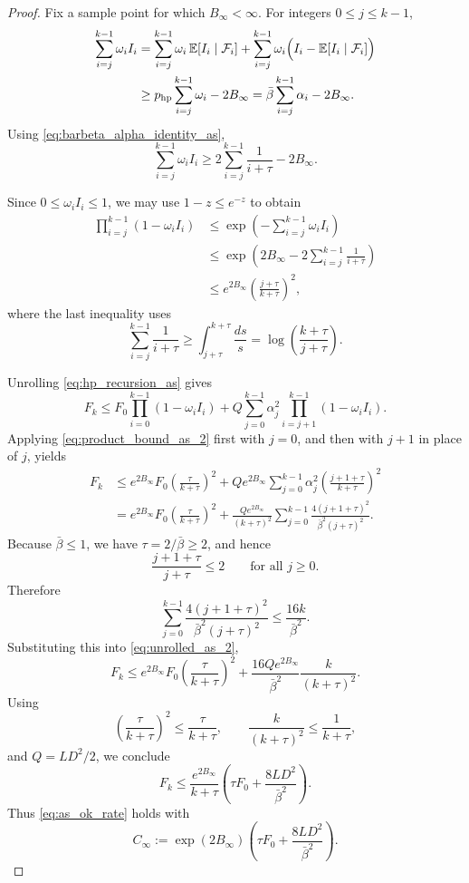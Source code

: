 \documentclass{article}
\begin{document}
\begin{proof}
Fix a sample point for which \(B_\infty<\infty\). For integers
\(0\le j\le k-1\),
\begin{align}
\sum_{i=j}^{k-1}\omega_i I_i
&=
\sum_{i=j}^{k-1}\omega_i\,\mathbb E[I_i\mid\mathcal F_i]
+
\sum_{i=j}^{k-1}
\omega_i\Bigl(I_i-\mathbb E[I_i\mid\mathcal F_i]\Bigr)
\nonumber\\
&\ge
p_{\mathrm{hp}}\sum_{i=j}^{k-1}\omega_i
-
2B_\infty
=
\bar\beta\sum_{i=j}^{k-1}\alpha_i
-
2B_\infty.
\label{eq:weighted_sum_lower_as_1}
\end{align}
Using \eqref{eq:barbeta_alpha_identity_as},
\begin{equation}
\sum_{i=j}^{k-1}\omega_i I_i
\ge
2\sum_{i=j}^{k-1}\frac1{i+\tau}
-
2B_\infty.
\label{eq:weighted_sum_lower_as_3}
\end{equation}

Since \(0\le \omega_iI_i\le1\), we may use \(1-z\le e^{-z}\) to obtain
\begin{align}
\prod_{i=j}^{k-1}(1-\omega_iI_i)
&\le
\exp\!\left(-\sum_{i=j}^{k-1}\omega_iI_i\right)
\nonumber\\
&\le
\exp\!\left(
2B_\infty
-
2\sum_{i=j}^{k-1}\frac1{i+\tau}
\right)
\nonumber\\
&\le
e^{2B_\infty}
\left(\frac{j+\tau}{k+\tau}\right)^2,
\label{eq:product_bound_as_2}
\end{align}
where the last inequality uses
\[
\sum_{i=j}^{k-1}\frac1{i+\tau}
\ge
\int_{j+\tau}^{k+\tau}\frac{ds}{s}
=
\log\!\left(\frac{k+\tau}{j+\tau}\right).
\]

Unrolling \eqref{eq:hp_recursion_as} gives
\begin{equation}
F_k
\le
F_0\prod_{i=0}^{k-1}(1-\omega_iI_i)
+
Q\sum_{j=0}^{k-1}
\alpha_j^2
\prod_{i=j+1}^{k-1}(1-\omega_iI_i).
\label{eq:unrolled_as}
\end{equation}
Applying \eqref{eq:product_bound_as_2} first with \(j=0\), and then with
\(j+1\) in place of \(j\), yields
\begin{align}
F_k
&\le
e^{2B_\infty}F_0
\left(\frac{\tau}{k+\tau}\right)^2
+
Qe^{2B_\infty}
\sum_{j=0}^{k-1}
\alpha_j^2
\left(\frac{j+1+\tau}{k+\tau}\right)^2
\nonumber\\
&=
e^{2B_\infty}F_0
\left(\frac{\tau}{k+\tau}\right)^2
+
\frac{Qe^{2B_\infty}}{(k+\tau)^2}
\sum_{j=0}^{k-1}
\frac{4(j+1+\tau)^2}{\bar\beta^2(j+\tau)^2}.
\label{eq:unrolled_as_2}
\end{align}
Because \(\bar\beta\le1\), we have \(\tau=2/\bar\beta\ge2\), and hence
\[
\frac{j+1+\tau}{j+\tau}\le2
\qquad\text{for all }j\ge0.
\]
Therefore
\[
\sum_{j=0}^{k-1}
\frac{4(j+1+\tau)^2}{\bar\beta^2(j+\tau)^2}
\le
\frac{16k}{\bar\beta^2}.
\]
Substituting this into \eqref{eq:unrolled_as_2},
\[
F_k
\le
e^{2B_\infty}F_0
\left(\frac{\tau}{k+\tau}\right)^2
+
\frac{16Qe^{2B_\infty}}{\bar\beta^2}
\frac{k}{(k+\tau)^2}.
\]
Using
\[
\left(\frac{\tau}{k+\tau}\right)^2
\le
\frac{\tau}{k+\tau},
\qquad
\frac{k}{(k+\tau)^2}\le \frac1{k+\tau},
\]
and \(Q=LD^2/2\), we conclude
\[
F_k
\le
\frac{e^{2B_\infty}}{k+\tau}
\left(
\tau F_0+\frac{8LD^2}{\bar\beta^2}
\right).
\]
Thus \eqref{eq:as_ok_rate} holds with
\[
C_\infty
:=
\exp(2B_\infty)
\left(
\tau F_0+\frac{8LD^2}{\bar\beta^2}
\right).
\]
\end{proof}
\end{document}
